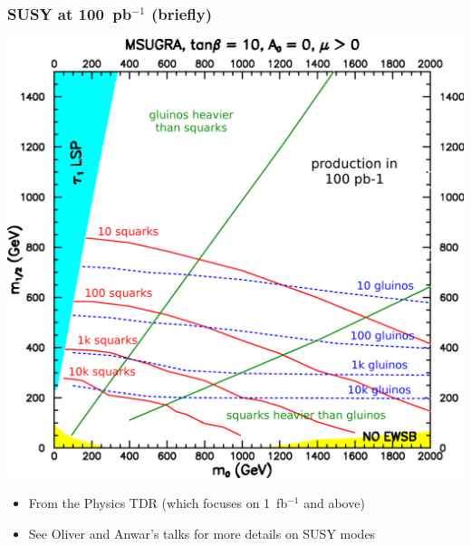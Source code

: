 \documentclass[compress]{beamer}
\begin{document}
\begin{frame}
\frametitle{SUSY at 100~pb$^{-1}$ (briefly)}
\begin{center}
\includegraphics[width=0.65\linewidth]{msugra_plane_ptdr.png}
\end{center}

\vspace{-0.5 cm}
\begin{itemize}
\item From the Physics TDR (which focuses on 1~fb$^{-1}$ and above)
\item See Oliver and Anwar's talks for more details on SUSY modes
\end{itemize}
\label{susy_at_100ipb}
\end{frame}




\end{document}
